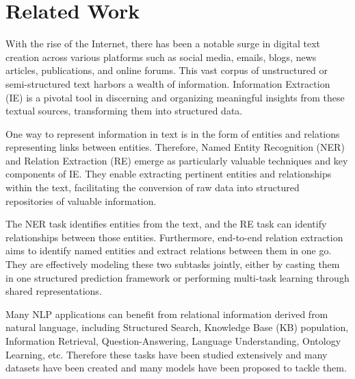 \chapter{Related Work}
\label{chp:relatedWork}

With the rise of the Internet, there has been a notable surge in digital text creation across various platforms such as social media, emails, blogs, news articles, publications, and online forums. This vast corpus of unstructured or semi-structured text harbors a wealth of information. Information Extraction (IE) is a pivotal tool in discerning and organizing meaningful insights from these textual sources, transforming them into structured data.

One way to represent information in text is in the form of entities and relations representing links between entities. Therefore, Named Entity Recognition (NER) and Relation Extraction (RE) emerge as particularly valuable techniques and key components of IE. They enable extracting pertinent entities and relationships within the text, facilitating the conversion of raw data into structured repositories of valuable information.

The NER task identifies entities from the text, and the RE task can identify relationships between those entities. Furthermore, end-to-end relation extraction aims to identify named entities and extract relations between them in one go. They are effectively modeling these two subtasks jointly\cite{Zhong2020AFE}, either by casting them in one structured prediction framework or performing multi-task learning through shared representations.

Many NLP applications can benefit from relational information derived from natural language\cite{Goyal2018RNE}, including Structured Search, Knowledge Base (KB) population, Information Retrieval, Question-Answering, Language Understanding, Ontology Learning, etc. Therefore these tasks have been studied extensively and many datasets have been created and many models have been proposed to tackle them.

